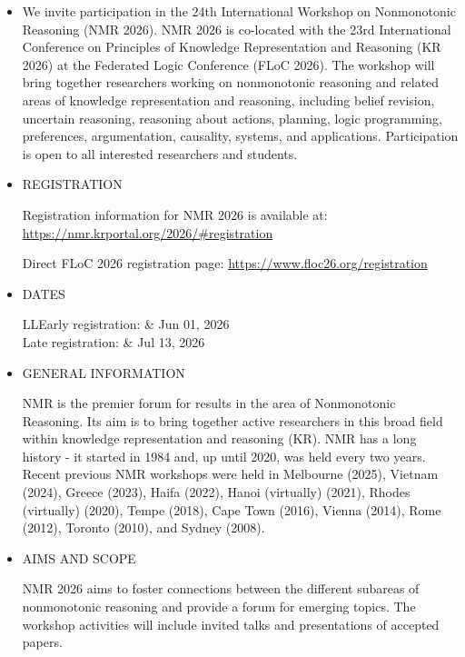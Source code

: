 \documentclass[prodmode,acmtecs]{acmsmall} %
\begin{document}
\begin{itemize}\item  We invite participation in the 24th International Workshop on Nonmonotonic Reasoning (NMR 2026). NMR 2026 is co-located with the 23rd International Conference on Principles of Knowledge Representation and Reasoning (KR 2026) at the Federated Logic Conference (FLoC 2026). The workshop will bring together researchers working on nonmonotonic reasoning and related areas of knowledge representation and reasoning, including belief revision, uncertain reasoning, reasoning about actions, planning, logic programming, preferences, argumentation, causality, systems, and applications. Participation is open to all interested researchers and students. 
 
\item  REGISTRATION 
 
  Registration information for NMR 2026 is available at: \href{https://nmr.krportal.org/2026/#registration}{https://nmr.krportal.org/2026/\#registration} 
 
  Direct FLoC 2026 registration page: \href{https://www.floc26.org/registration}{https://www.floc26.org/registration} 
 
\item  DATES 
 
\begin{tabulary}{\linewidth}{LL}Early registration:  & Jun 01, 2026 \\
Late registration:  & Jul 13, 2026 \\
\end{tabulary}
 
\item  GENERAL INFORMATION 
 
  NMR is the premier forum for results in the area of Nonmonotonic Reasoning. Its aim is to bring together active researchers in this broad field within knowledge representation and reasoning (KR). NMR has a long history - it started in 1984 and, up until 2020, was held every two years. Recent previous NMR workshops were held in Melbourne (2025), Vietnam (2024), Greece (2023), Haifa (2022), Hanoi (virtually) (2021), Rhodes (virtually) (2020), Tempe (2018), Cape Town (2016), Vienna (2014), Rome (2012), Toronto (2010), and Sydney (2008). 
 
\item  AIMS AND SCOPE 
 
  NMR 2026 aims to foster connections between the different subareas of nonmonotonic reasoning and provide a forum for emerging topics. The workshop activities will include invited talks and presentations of accepted papers. 
 

\end{itemize}
\end{document}
